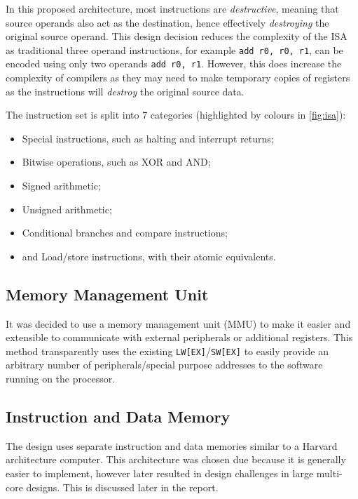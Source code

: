 In this proposed architecture, most instructions are \textit{destructive}, meaning that source operands also act as the destination, hence effectively \textit{destroying} the original source operand. This design decision reduces the complexity of the ISA as traditional three operand instructions, for example \verb|add r0, r0, r1|, can be encoded using only two operands \verb|add r0, r1|. However, this does increase the complexity of compilers as they may need to make temporary copies of registers as the instructions will \textit{destroy} the original source data.

The instruction set is split into 7 categories (highlighted by colours in \cref{fig:isa}):
\begin{itemize}
\item Special instructions, such as halting and interrupt returns;
\item Bitwise operations, such as XOR and AND;
\item Signed arithmetic;
\item Unsigned arithmetic;
\item Conditional branches and compare instructions;
\item and Load/store instructions, with their atomic equivalents.
\end{itemize}


\subsection{Memory Management Unit}
It was decided to use a memory management unit (MMU) to make it easier and extensible to communicate with external peripherals or additional registers. This method transparently uses the existing \verb|LW[EX]|/\verb|SW[EX]| to easily provide an arbitrary number of peripherals/special purpose addresses to the software running on the processor.

\subsection{Instruction and Data Memory}
The design uses separate instruction and data memories similar to a Harvard architecture computer. This architecture was chosen due because it is generally easier to implement, however later resulted in design challenges in large multi-core designs. This is discussed later in the report.

